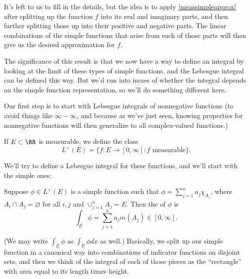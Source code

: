 It's left to us to fill in the details, but the idea is to apply \cref{meassimpleapprox} after splitting up the function $f$ into its real and imaginary parts, and then further splitting those up into their positive and negative parts. The linear combinations of the simple functions that arise from each of those parts will then give us the desired approximation for $f$. 

The significance of this result is that we now have a way to define an integral by looking at the limit of these types of simple functions, and the Lebesgue integral can be defined this way. But we'd run into issues of whether the integral depends on the simple function representation, so we'll do something different here.

Our first step is to start with Lebesgue integrals of nonnegative functions (to avoid things like $\infty - \infty$, and because as we've just seen, knowing properties for nonnegative functions will then generalize to all complex-valued functions.)

\begin{definition}
If $E \subset \RR$ is measurable, we define the class 
\[
    L^+(E) = \{f: E \to [0, \infty]: f \text{ measurable}\}.
\]
\end{definition}

We'll try to define a Lebesgue integral for these functions, and we'll start with the simple ones: 

\begin{definition}
Suppose $\phi \in L^+(E)$ is a simple function such that $\phi = \sum_{j=1}^n a_j \chi_{A_j}$, where $A_i \cap A_j = \varnothing$ for all $i, j$ and $\cup_{j=1}^n A_j = E$. Then the  of $\phi$ is 
\[
    \int_E \phi = \sum_{j=1}^n a_j m(A_j) \in [0, \infty].
\]
\end{definition}

(We may write $\int_E \phi$ as $\int_E \phi dx$ as well.) Basically, we split up our simple function in a canonical way into combinations of indicator functions on disjoint sets, and then we think of the integral of each of those pieces as the ``rectangle'' with area equal to its length times height.

